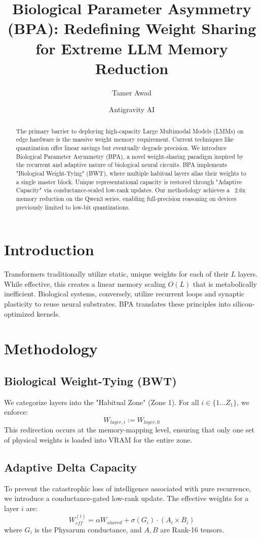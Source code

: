 \documentclass[10pt,twocolumn,letterpaper]{article}
\title{Biological Parameter Asymmetry (BPA): Redefining Weight Sharing for Extreme LLM Memory Reduction}
\author[1]{Tamer Awad}
\author[2]{Antigravity AI}
\affil[1]{Menofia University, Egypt}
\affil[2]{Advanced Agentic Coding Team}
\date{}
\begin{document}
\maketitle

\begin{abstract}
The primary barrier to deploying high-capacity Large Multimodal Models (LMMs) on edge hardware is the massive weight memory requirement. Current techniques like quantization offer linear savings but eventually degrade precision. We introduce Biological Parameter Asymmetry (BPA), a novel weight-sharing paradigm inspired by the recurrent and adaptive nature of biological neural circuits. BPA implements "Biological Weight-Tying" (BWT), where multiple habitual layers alias their weights to a single master block. Unique representational capacity is restored through "Adaptive Capacity" via conductance-scaled low-rank updates. Our methodology achieves a ~2.6x memory reduction on the Qwen3 series, enabling full-precision reasoning on devices previously limited to low-bit quantizations.
\end{abstract}

\section{Introduction}
Transformers traditionally utilize static, unique weights for each of their $L$ layers. While effective, this creates a linear memory scaling $O(L)$ that is metabolically inefficient. Biological systems, conversely, utilize recurrent loops and synaptic plasticity to reuse neural substrates. BPA translates these principles into silicon-optimized kernels.

\section{Methodology}

\subsection{Biological Weight-Tying (BWT)}
We categorize layers into the "Habitual Zone" (Zone 1). For all $i \in \{1 \dots Z_1\}$, we enforce:
\begin{equation}
W_{layer, i} := W_{layer, 0}
\end{equation}
This redirection occurs at the memory-mapping level, ensuring that only one set of physical weights is loaded into VRAM for the entire zone.

\subsection{Adaptive Delta Capacity}
To prevent the catastrophic loss of intelligence associated with pure recurrence, we introduce a conductance-gated low-rank update. The effective weights for a layer $i$ are:
\begin{equation}
W_{eff}^{(i)} = \alpha W_{shared} + \sigma(G_i) \cdot (A_i \times B_i)
\end{equation}
where $G_i$ is the Physarum conductance, and $A, B$ are Rank-16 tensors.
\end{document}
